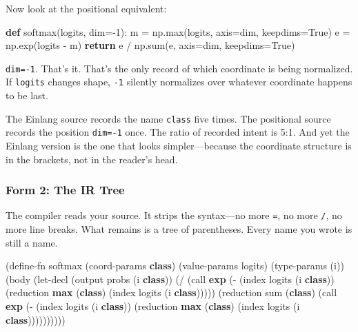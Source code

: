 \documentclass[11pt,titlepage]{article}
\newenvironment{Shaded}{}{}
\newcommand{\BuiltInTok}[1]{#1}
\newcommand{\ControlFlowTok}[1]{\textcolor[rgb]{0.00,0.44,0.13}{\textbf{#1}}}
\newcommand{\DecValTok}[1]{\textcolor[rgb]{0.25,0.63,0.44}{#1}}
\newcommand{\KeywordTok}[1]{\textcolor[rgb]{0.00,0.44,0.13}{\textbf{#1}}}
\newcommand{\NormalTok}[1]{#1}
\newcommand{\OperatorTok}[1]{\textcolor[rgb]{0.40,0.40,0.40}{#1}}
\newcommand{\VariableTok}[1]{\textcolor[rgb]{0.10,0.09,0.49}{#1}}
\begin{document}
Now look at the positional equivalent:

\begin{Shaded}
\begin{Highlighting}[]
\KeywordTok{def}\NormalTok{ softmax(logits, dim}\OperatorTok{=-}\DecValTok{1}\NormalTok{):}
\NormalTok{    m }\OperatorTok{=}\NormalTok{ np.}\BuiltInTok{max}\NormalTok{(logits, axis}\OperatorTok{=}\NormalTok{dim, keepdims}\OperatorTok{=}\VariableTok{True}\NormalTok{)}
\NormalTok{    e }\OperatorTok{=}\NormalTok{ np.exp(logits }\OperatorTok{-}\NormalTok{ m)}
    \ControlFlowTok{return}\NormalTok{ e }\OperatorTok{/}\NormalTok{ np.}\BuiltInTok{sum}\NormalTok{(e, axis}\OperatorTok{=}\NormalTok{dim, keepdims}\OperatorTok{=}\VariableTok{True}\NormalTok{)}
\end{Highlighting}
\end{Shaded}

\texttt{dim=-1}. That's it. That's the only record of which coordinate
is being normalized. If \texttt{logits} changes shape, \texttt{-1}
silently normalizes over whatever coordinate happens to be last.

The Einlang source records the name \texttt{class} five times. The
positional source records the position \texttt{dim=-1} once. The ratio
of recorded intent is 5:1. And yet the Einlang version is the one that
looks simpler---because the coordinate structure is in the brackets, not
in the reader's head.

\vspace{2em}

\hypertarget{form-2-the-ir-tree}{%
\subsubsection{Form 2: The IR Tree}\label{form-2-the-ir-tree}}

The compiler reads your source. It strips the syntax---no more
\texttt{=}, no more \texttt{/}, no more line breaks. What remains is a
tree of parentheses. Every name you wrote is still a name.

\begin{Shaded}
\begin{Highlighting}[]
\NormalTok{(define-fn softmax (coord-params }\KeywordTok{class}\NormalTok{) (value-params logits)}
\NormalTok{  (type-params (i))}
\NormalTok{  (body}
\NormalTok{    (let-decl (output probs (i }\KeywordTok{class}\NormalTok{))}
\NormalTok{      (}\OperatorTok{/}\NormalTok{ (call }\KeywordTok{exp}
\NormalTok{           (}\OperatorTok{-}\NormalTok{ (index logits (i }\KeywordTok{class}\NormalTok{))}
\NormalTok{              (reduction }\KeywordTok{max}\NormalTok{ (}\KeywordTok{class}\NormalTok{)}
\NormalTok{                (index logits (i }\KeywordTok{class}\NormalTok{)))))}
\NormalTok{         (reduction sum (}\KeywordTok{class}\NormalTok{)}
\NormalTok{           (call }\KeywordTok{exp}
\NormalTok{             (}\OperatorTok{-}\NormalTok{ (index logits (i }\KeywordTok{class}\NormalTok{))}
\NormalTok{                (reduction }\KeywordTok{max}\NormalTok{ (}\KeywordTok{class}\NormalTok{)}
\NormalTok{                  (index logits (i }\KeywordTok{class}\NormalTok{))))))))))}
\end{Highlighting}
\end{Shaded}
\end{document}

